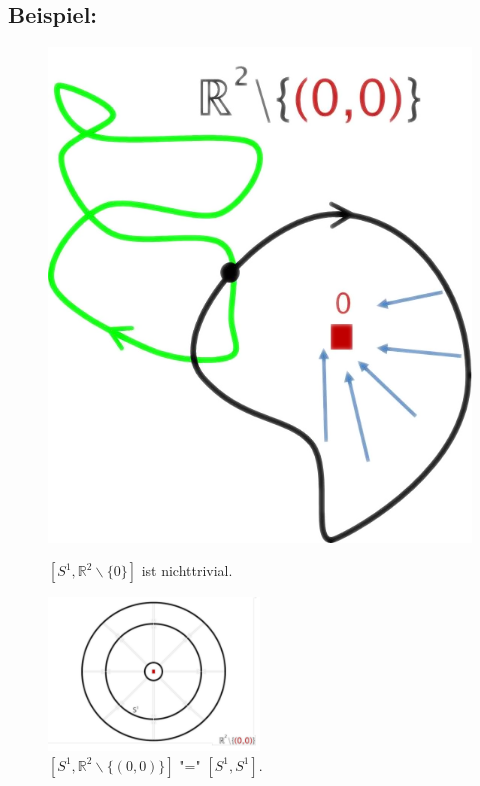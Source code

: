 \documentclass[a4paper,11pt,notitlepage]{report}
\theoremstyle{definition}
\newcommand{\R}{{\ensuremath{\mathbb{R}}}}
\newenvironment{bsp}[1]
{
\setlength{\fboxsep}{10pt}
\subsection*{Beispiel: #1}
\begin{upshape}
}
{
\end{upshape}
}
\begin{document}
\begin{bsp}{}
\begin{figure}[h]
\centering
\begin{minipage}[b]{6cm}\includegraphics[scale=0.4]{images/Homotop_Schleifen_R_ohne_0.png}
\caption{$[S^1, \R^2 \backslash \{0\}]$ ist nichttrivial.}
\end{minipage}

\begin{minipage}[b]{6cm}\includegraphics[width=0.5\textwidth]{images/S1_und_R2_ohne_0.png}
\caption{$[S^1,\R^2\backslash\{(0,0)\}]\text{ "=" }[S^1,S^1]$.}
\end{minipage}

\end{figure}
\end{bsp}
\end{document}
